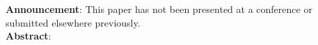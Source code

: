 \hspace{-17pt}\textbf{Announcement}: 
This paper has not been presented at a conference or submitted elsewhere previously.\\
\textbf{Abstract}: 